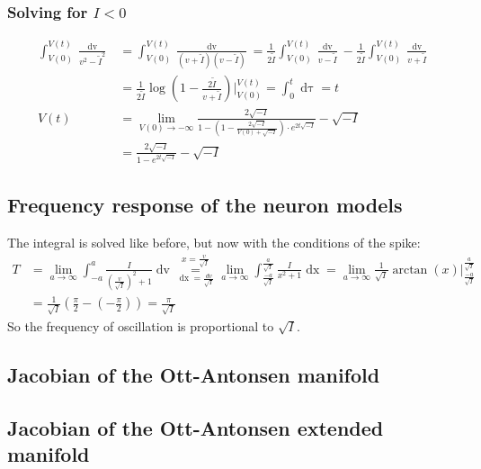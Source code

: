 \subsubsection{Solving for \texorpdfstring{$I < 0$}{TEXT}}
\begin{align*}
\int_{V(0)}^{V(t)} \frac{\mathop{dv}}{v^2 - \tilde{I}^2} &= \int_{V(0)}^{V(t)} \frac{\mathop{dv}}{(v+\tilde{I})(v-\tilde{I})} 
= \frac{1}{2 \tilde{I}} \int_{V(0)}^{V(t)} \frac{\mathop{dv}}{v-\tilde{I}}-\frac{1}{2 \tilde{I}} \int_{V(0)}^{V(t)} \frac{\mathop{dv}}{v+\tilde{I}} \\
&= \frac{1}{2 \tilde{I}} \log \left(1-\frac{2 \tilde{I}}{v+\tilde{I}}\right) \Big \rvert_{V(0)}^{V(t)} 
= \int_0^t \mathop{d\tau} = t \\
V(t) &= \lim_{V(0) \rightarrow -\infty} \frac{2 \sqrt{-I}}{1 - \left(1-\frac{2 \sqrt{-I}}{V(0)+\sqrt{-I}}\right)\cdot e^{2 t \sqrt{-I}}}-\sqrt{-I}\\
&= \frac{2 \sqrt{-I}}{1 - e^{2 t \sqrt{-I}}}-\sqrt{-I}
\end{align*}


\subsection{Frequency response of the neuron models} \label{app:ThetaModelFrequencyResponse}
The integral is solved like before, but now with the conditions of the spike:
\begin{align*}
T &= \lim_{a \rightarrow \infty} \int_{-a}^{a} \frac{I}{\left(\frac{v}{\sqrt{I}}\right)^2 + 1} \mathop{dv} 
\overset{x = \frac{v}{\sqrt{I}}}{\underset{\mathop{dx} = \frac{dv}{\sqrt{I}}}{=}} 
\lim_{a \rightarrow \infty} \int_{\frac{-a}{\sqrt{I}}}^{\frac{a}{\sqrt{I}}} \frac{I}{x^2 + 1} \mathop{dx}
= \lim_{a \rightarrow \infty} \frac{1}{\sqrt{I}} \arctan(x) \Big \rvert_{\frac{-a}{\sqrt{I}}}^{\frac{a}{\sqrt{I}}} \\
&= \frac{1}{\sqrt{I}} \left( \frac{\pi}{2} - \left( - \frac{\pi}{2} \right) \right)
= \frac{\pi}{\sqrt{I}}
\end{align*}
So the frequency of oscillation is proportional to $\sqrt{I}$. 

\subsection{Jacobian of the Ott-Antonsen manifold}
\subsection{Jacobian of the Ott-Antonsen extended manifold}







